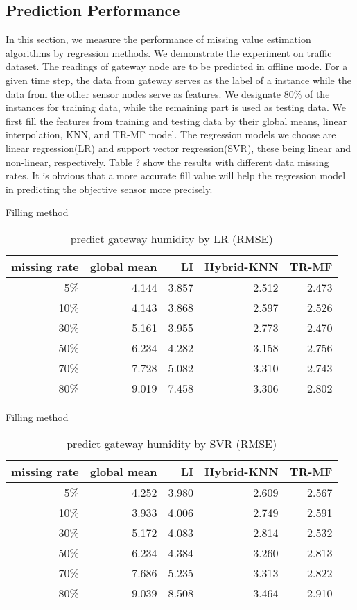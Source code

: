 \subsection{Prediction Performance}
In this section, we measure the performance of missing value estimation algorithms by regression methods.
We demonstrate the experiment on traffic dataset.
The readings of gateway node are to be predicted in offline mode.
For a given time step, the data from gateway serves as the label of a instance while the data from the other sensor nodes serve as features.
We designate 80\% of the instances for training data, while the remaining part is used as testing data.
We first fill the features from training and testing data by their global means, linear interpolation, KNN, and TR-MF model.
The regression models we choose are linear regression(LR) and support vector regression(SVR), these being linear and non-linear, respectively.
Table ? show the results with different data missing rates.
It is obvious that a more accurate fill value will help the regression model in predicting the objective sensor more precisely.

\begin{table} [htbp]
\centering
\caption{predict gateway humidity by LR (RMSE) }
\label{table: LR}
   Filling method
\begin{tabular}{ r | r r r r}
        missing rate&global mean     &LI   &Hybrid-KNN &TR-MF\\ \hline
        5\%      &4.144&3.857&2.512&2.473\\
        10\%    &4.143&3.868& 2.597&2.526\\
        30\%    &5.161&3.955&2.773&2.470\\
        50\%    &6.234&4.282&3.158&2.756\\
        70\%   &7.728&5.082&3.310&2.743\\
        80\%   &9.019&7.458&3.306&2.802\\
\end{tabular}
\end{table}

\begin{table}[htbp]
\centering
\caption{predict gateway humidity by SVR (RMSE) }
\label{table: SVR}
   Filling method
\begin{tabular}{ r | r r r r}
        missing rate&global mean     &LI   &Hybrid-KNN &TR-MF\\ \hline
        5\%&4.252&3.980&2.609&2.567\\
        10\%    &3.933 &4.006&2.749&2.591\\
        30\%    &5.172&4.083&2.814&2.532\\
        50\%    &6.234&4.384&3.260&2.813\\
        70\%   &7.686&5.235&3.313&2.822\\
        80\%  &9.039&8.508&3.464&2.910\\
\end{tabular}
\end{table}
